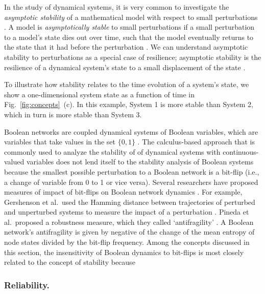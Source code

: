 \documentclass{comnet-mod}
\begin{document}
In the study of dynamical systems, it is very common to investigate the \textit{asymptotic stability} of a mathematical model with respect to small perturbations \cite[p.\,143]{Strogatz2018}. A model is \textit{asymptotically stable} to small perturbations if a small perturbation to a model's state dies out over time, such that the model eventually returns to the state that it had before the perturbation \cite[p.\,3]{Guckenheimer2013}. We can understand asymptotic stability to perturbations as a special case of resilience; asymptotic stability is the resilience of a dynamical system's state to a small displacement of the state \cite{Stelling2004, Lesne2008}.

To illustrate how stability relates to the time evolution of a system's state, we show a one-dimensional system state as a function of time in Fig.~\ref{fig:concepts}~(c). In this example, System 1 is more stable than System 2, which in turn is more stable than System 3.

Boolean networks are coupled dynamical systems of Boolean variables, which are variables that take values in the set $\{0,1\}$ \cite{Schwab2020}. The calculus-based approach that is commonly used to analyze the stability of of dynamical systems with continuous-valued variables does not lend itself to the stability analysis of Boolean systems because the smallest possible perturbation to a Boolean network is a bit-flip (i.e., a change of variable from 0 to 1 or vice versa). Several researchers have proposed measures of impact of bit-flips on Boolean network dynamics \cite{Gershenson2005, Pineda2019, Schwab2020}. For example, Gershenson et al.~used the Hamming distance between trajectories of perturbed and unperturbed systems to measure the impact of a perturbation \cite{Gershenson2005}. Pineda et al.~proposed a robustness measure, which they called `antifragility' \cite{Pineda2019}. A Boolean network's antifragility is given by negative of the change of the mean entropy of node states divided by the bit-flip frequency. Among the concepts discussed in this section, the insensitivity of Boolean dynamics to bit-flips is most closely related to the concept of stability because  


\subsubsection{Reliability.}
\end{document}
